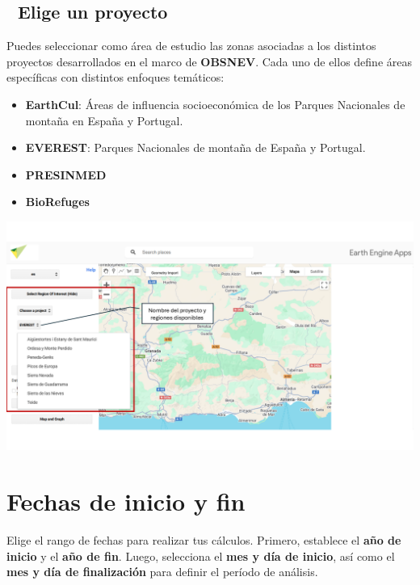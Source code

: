 \documentclass[
]{book}
\providecommand{\tightlist}{%
  \setlength{\itemsep}{0pt}\setlength{\parskip}{0pt}}
\begin{document}
\section{\texorpdfstring{\textbf{📁 Elige un proyecto}}{📁 Elige un proyecto}}\label{elige-un-proyecto}

Puedes seleccionar como área de estudio las zonas asociadas a los distintos proyectos desarrollados en el marco de \textbf{OBSNEV}. Cada uno de ellos define áreas específicas con distintos enfoques temáticos:

\begin{itemize}
\tightlist
\item
  \textbf{EarthCul}: Áreas de influencia socioeconómica de los Parques Nacionales de montaña en España y Portugal.\\
\item
  \textbf{EVEREST}: Parques Nacionales de montaña de España y Portugal.\\
\item
  \textbf{PRESINMED}\\
\item
  \textbf{BioRefuges}
\end{itemize}

\includegraphics{assets/PROJECTS_es.png}

\chapter{Fechas de inicio y fin}\label{fechas}

Elige el rango de fechas para realizar tus cálculos. Primero, establece el \textbf{año de inicio} y el \textbf{año de fin}. Luego, selecciona el \textbf{mes y día de inicio}, así como el \textbf{mes y día de finalización} para definir el período de análisis.
\end{document}
